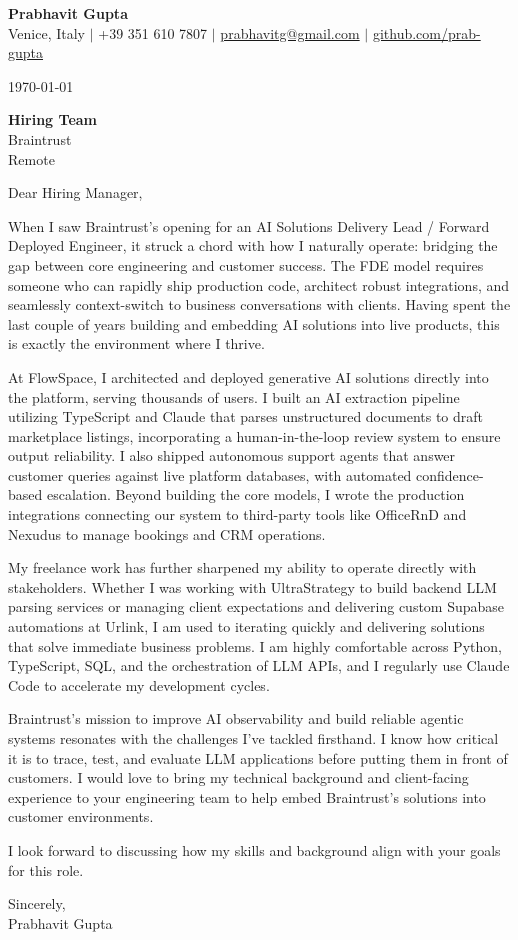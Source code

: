 \documentclass[a4paper,11pt]{article}
\begin{document}
\begin{center}
    {\Huge \textbf{Prabhavit Gupta}}\\[1ex]
    Venice, Italy $\vert$ +39 351 610 7807 $\vert$ \href{mailto:prabhavitg@gmail.com}{prabhavitg@gmail.com} $\vert$ \href{https://github.com/prab-gupta}{github.com/prab-gupta}
\end{center}

\vspace{2em}
\today

\textbf{Hiring Team}\\
Braintrust\\
Remote

\vspace{1em}
Dear Hiring Manager,

When I saw Braintrust's opening for an AI Solutions Delivery Lead / Forward Deployed Engineer, it struck a chord with how I naturally operate: bridging the gap between core engineering and customer success. The FDE model requires someone who can rapidly ship production code, architect robust integrations, and seamlessly context-switch to business conversations with clients. Having spent the last couple of years building and embedding AI solutions into live products, this is exactly the environment where I thrive.

At FlowSpace, I architected and deployed generative AI solutions directly into the platform, serving thousands of users. I built an AI extraction pipeline utilizing TypeScript and Claude that parses unstructured documents to draft marketplace listings, incorporating a human-in-the-loop review system to ensure output reliability. I also shipped autonomous support agents that answer customer queries against live platform databases, with automated confidence-based escalation. Beyond building the core models, I wrote the production integrations connecting our system to third-party tools like OfficeRnD and Nexudus to manage bookings and CRM operations. 

My freelance work has further sharpened my ability to operate directly with stakeholders. Whether I was working with UltraStrategy to build backend LLM parsing services or managing client expectations and delivering custom Supabase automations at Urlink, I am used to iterating quickly and delivering solutions that solve immediate business problems. I am highly comfortable across Python, TypeScript, SQL, and the orchestration of LLM APIs, and I regularly use Claude Code to accelerate my development cycles.

Braintrust's mission to improve AI observability and build reliable agentic systems resonates with the challenges I've tackled firsthand. I know how critical it is to trace, test, and evaluate LLM applications before putting them in front of customers. I would love to bring my technical background and client-facing experience to your engineering team to help embed Braintrust's solutions into customer environments. 

I look forward to discussing how my skills and background align with your goals for this role.

Sincerely,\\
\vspace{1em}
Prabhavit Gupta
\end{document}
